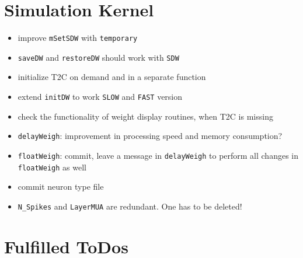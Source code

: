 \documentclass[12pt]{article}
\begin{document}
\section{Simulation Kernel}

\begin{itemize}
\item improve \texttt{mSetSDW} with \texttt{temporary}
\item \texttt{saveDW} and \texttt{restoreDW} should work with \texttt{SDW}
\item initialize T2C on demand and in a separate function
\item extend \texttt{initDW} to work \texttt{SLOW} and \texttt{FAST} version
\item check the functionality of weight display routines, when T2C is missing
\item \texttt{delayWeigh}: improvement in processing speed and memory consumption?
\item \texttt{floatWeigh}: commit, leave a message in \texttt{delayWeigh} to perform all changes in \texttt{floatWeigh} as well
\item commit neuron type file
\item \texttt{N_Spikes} and \texttt{LayerMUA} are redundant. One has to be deleted!
\end{itemize}



\section{Fulfilled ToDos}
\end{document}
